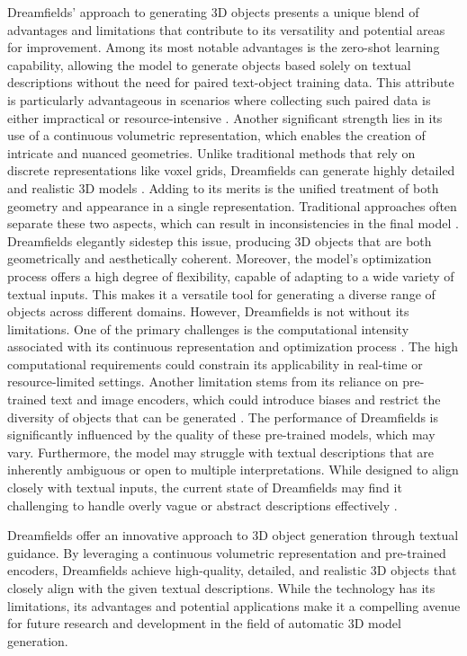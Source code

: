 Dreamfields' approach to generating 3D objects presents a unique blend of advantages and limitations that contribute to its versatility and potential areas for improvement. Among its most notable advantages is the zero-shot learning capability, allowing the model to generate objects based solely on textual descriptions without the need for paired text-object training data. This attribute is particularly advantageous in scenarios where collecting such paired data is either impractical or resource-intensive \citep{jainDreamFields}. Another significant strength lies in its use of a continuous volumetric representation, which enables the creation of intricate and nuanced geometries. Unlike traditional methods that rely on discrete representations like voxel grids, Dreamfields can generate highly detailed and realistic 3D models \citep{jainDreamFields}. Adding to its merits is the unified treatment of both geometry and appearance in a single representation. Traditional approaches often separate these two aspects, which can result in inconsistencies in the final model \citep{jainDreamFields}. Dreamfields elegantly sidestep this issue, producing 3D objects that are both geometrically and aesthetically coherent. Moreover, the model's optimization process offers a high degree of flexibility, capable of adapting to a wide variety of textual inputs. This makes it a versatile tool for generating a diverse range of objects across different domains. However, Dreamfields is not without its limitations. One of the primary challenges is the computational intensity associated with its continuous representation and optimization process \citep{jainDreamFields}. The high computational requirements could constrain its applicability in real-time or resource-limited settings. Another limitation stems from its reliance on pre-trained text and image encoders, which could introduce biases and restrict the diversity of objects that can be generated \citep{jainDreamFields}. The performance of Dreamfields is significantly influenced by the quality of these pre-trained models, which may vary. Furthermore, the model may struggle with textual descriptions that are inherently ambiguous or open to multiple interpretations. While designed to align closely with textual inputs, the current state of Dreamfields may find it challenging to handle overly vague or abstract descriptions effectively \citep{jainDreamFields}.

Dreamfields offer an innovative approach to 3D object generation through textual guidance. By leveraging a continuous volumetric representation and pre-trained encoders, Dreamfields achieve high-quality, detailed, and realistic 3D objects that closely align with the given textual descriptions. While the technology has its limitations, its advantages and potential applications make it a compelling avenue for future research and development in the field of automatic 3D model generation.

